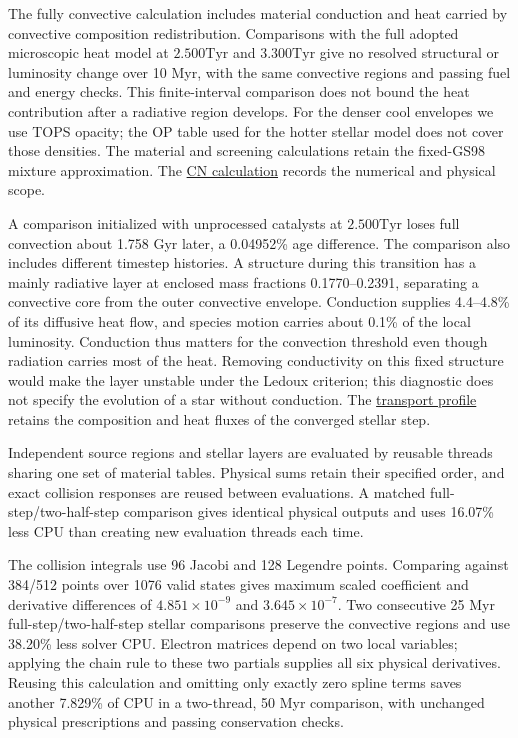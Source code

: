 \documentclass[11pt,letterpaper]{article}
\newcommand{\Tyr}{\mathrm{Tyr}}
\newcommand{\doc}[2]{\href{https://github.com/oklo/ember/blob/codex/atmosphere5000-density-checks/#1}{#2}}
\begin{document}
The fully convective calculation includes material conduction and heat carried
by convective composition redistribution. Comparisons with the full adopted
microscopic heat model at $2.500\Tyr$ and $3.300\Tyr$ give no resolved
structural or luminosity change over 10 Myr, with the same convective regions
and passing fuel and energy checks. This finite-interval comparison does not
bound the heat contribution after a radiative region develops. For the denser
cool envelopes we use TOPS opacity; the OP table used for the hotter stellar
model does not cover those densities. The material and screening calculations
retain the fixed-GS98 mixture approximation. The
\doc{docs/CN_BURNING.md}{CN calculation} records the numerical and physical scope.

A comparison initialized with unprocessed catalysts at $2.500\Tyr$ loses
full convection about 1.758 Gyr later, a 0.04952\% age difference. The
comparison also includes different timestep histories. A structure during
this transition has a mainly radiative layer at enclosed
mass fractions 0.1770--0.2391, separating a convective core from the outer
convective envelope. Conduction supplies 4.4--4.8\% of its diffusive heat
flow, and species motion carries about 0.1\% of the local luminosity.
Conduction thus matters for the convection threshold even though radiation
carries most of the heat. Removing conductivity on this fixed structure
would make the layer unstable under the Ledoux criterion; this diagnostic
does not specify the evolution of a star without conduction. The
\doc{docs/results/cn_first_radiative_layer_v1.json}{transport profile}
retains the composition and heat fluxes of the converged stellar step.

Independent source regions and stellar layers are evaluated by reusable
threads sharing one set of material tables. Physical sums retain their
specified order, and exact collision responses are reused between evaluations.
A matched full-step/two-half-step comparison gives identical physical outputs
and uses 16.07\% less CPU than creating new evaluation threads each time.

The collision integrals use 96 Jacobi and 128 Legendre points. Comparing
against 384/512 points over 1076 valid states gives maximum scaled coefficient
and derivative differences of $4.851\times10^{-9}$ and
$3.645\times10^{-7}$. Two consecutive 25 Myr full-step/two-half-step stellar
comparisons preserve the convective regions and use 38.20\% less solver CPU.
Electron matrices depend on two local variables; applying the chain rule to
these two partials supplies all six physical derivatives. Reusing this
calculation and omitting only exactly zero spline terms saves another
7.829\% of CPU in a two-thread, 50 Myr comparison, with unchanged physical
prescriptions and passing conservation checks.
\end{document}
